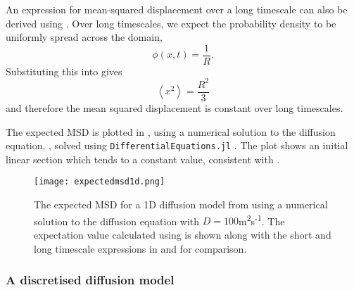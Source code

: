 An expression for mean-squared displacement over a long timescale can also be derived using . Over long timescales, we expect the probability density to be uniformly spread across the domain,
%
\begin{equation}
\phi(x,t) = \frac{1}{R} .
\end{equation}
%
Substituting this into  gives
%
\begin{equation}
\left<x^2\right> = \frac{R^2}{3}
\label{eqn:diffusion_long1d}
\end{equation}
%
and therefore the mean squared displacement is constant over long timescales.

The expected MSD is plotted in , using a numerical solution to the
diffusion equation, , solved using \texttt{DifferentialEquations.jl} \cite{DifferentialEquations}. The plot shows an initial linear section which tends to a constant value, consistent with .
%
\begin{figure} [t]
    \centering
        \texttt{[image: expectedmsd1d.png]}
        \caption{The expected MSD for a 1D diffusion model from  using a numerical solution to the diffusion equation with $D=100$m\textsuperscript{2}s\textsuperscript{-1}. The expectation value calculated using  is shown along with the short and long timescale expressions in  and  for comparison.}
        \label{fig:expectedmsd1d}
\end{figure}


 \subsubsection{A discretised diffusion model} \label{1ddiscrete}

